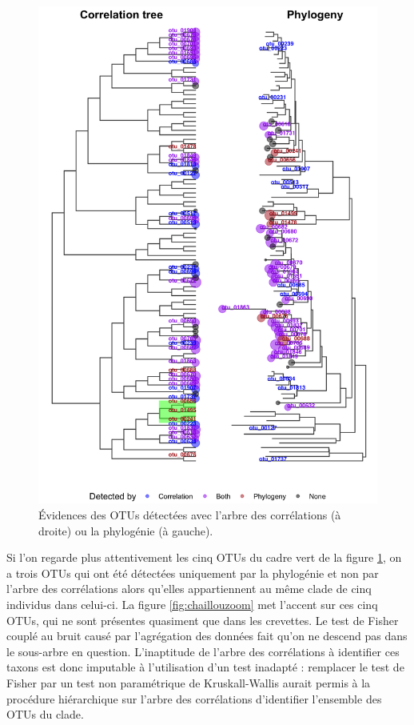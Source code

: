 \documentclass[12pt,a4paper]{reedthesis}
\theoremstyle{definition}
\theoremstyle{definition}
\theoremstyle{definition}
\theoremstyle{remark}
\begin{document}
\begin{figure}

{\centering \includegraphics[width=0.9\linewidth]{img/chaillou_trees} 

}

\caption{Évidences des OTUs détectées avec l'arbre des corrélations (à droite) ou la phylogénie (à gauche).}\label{fig:chailloutrees}
\end{figure}
Si l'on regarde plus attentivement les cinq OTUs du cadre vert de la figure \ref{fig:chailloutrees}, on a trois OTUs qui ont été détectées uniquement par la phylogénie et non par l'arbre des corrélations alors qu'elles appartiennent au même clade de cinq individus dans celui-ci. La figure \ref{fig:chaillouzoom} met l'accent sur ces cinq OTUs, qui ne sont présentes quasiment que dans les crevettes. Le test de Fisher couplé au bruit causé par l'agrégation des données fait qu'on ne descend pas dans le sous-arbre en question. L'inaptitude de l'arbre des corrélations à identifier ces taxons est donc imputable à l'utilisation d'un test inadapté : remplacer le test de Fisher par un test non paramétrique de Kruskall-Wallis aurait permis à la procédure hiérarchique sur l'arbre des corrélations d'identifier l'ensemble des OTUs du clade.
\end{document}
